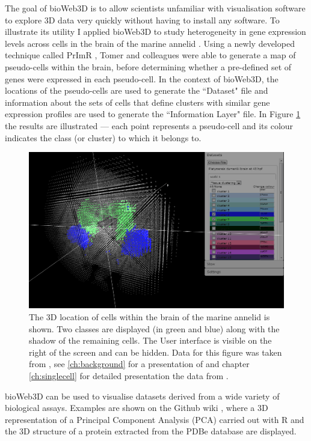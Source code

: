 	The goal of bioWeb3D is to allow scientists unfamiliar with visualisation software to explore 3D data very quickly without having to install any software.
	To illustrate its utility I applied bioWeb3D to study heterogeneity in gene expression levels across cells in the brain of the marine annelid \platyfull{}. Using a newly developed technique called PrImR \cite{Tomer10}, Tomer and colleagues were able to generate a map of pseudo-cells within the \platy{} brain, before determining whether a pre-defined set of genes were expressed in each pseudo-cell. In the context of bioWeb3D, the locations of the pseudo-cells are used to generate the ``Dataset" file and information about the sets of cells that define clusters with similar gene expression profiles are used to generate the ``Information Layer" file. In Figure \ref{fig:bioweb3d} the results are illustrated ---  each point represents a pseudo-cell and its colour indicates the class (or cluster) to which it belongs to. 
	
	\begin{figure}[h]
\centerline{\includegraphics[width=\linewidth]{gfx/chapter3/bioweb3d.png}}
\caption{The 3D location of cells within the brain of the marine annelid \platyfull{} is shown. Two classes are displayed (in green and blue) along with the shadow of the remaining cells. The User interface is visible on the right of the screen and can be hidden. Data for this figure was taken from \cite{Tomer10}, see \ref{ch:background} for a presentation of \platy{} and chapter \ref{ch:singlecell} for detailed presentation the data from \cite{Tomer}.}\label{fig:bioweb3d}
	\end{figure}

	bioWeb3D can be used to visualise datasets derived from a wide variety of biological assays. Examples are shown on the Github wiki \cite{github}, where a 3D representation of a Principal Component Analysis (PCA) carried out with R and the 3D structure of a protein extracted from the PDBe database are displayed.
	
